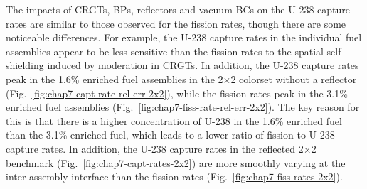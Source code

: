 
The impacts of \acp{CRGT}, \acp{BP}, reflectors and vacuum \acp{BC} on the U-238 capture rates are similar to those observed for the fission rates, though there are some noticeable differences. For example, the U-238 capture rates in the individual fuel assemblies appear to be less sensitive than the fission rates to the spatial self-shielding induced by moderation in \acp{CRGT}. In addition, the U-238 capture rates peak in the 1.6\% enriched fuel assemblies in the 2$\times$2 colorset without a reflector (Fig.~\ref{fig:chap7-capt-rate-rel-err-2x2}), while the fission rates peak in the 3.1\% enriched fuel assemblies (Fig.~\ref{fig:chap7-fiss-rate-rel-err-2x2}). The key reason for this is that there is a higher concentration of U-238 in the 1.6\% enriched fuel than the 3.1\% enriched fuel, which leads to a lower ratio of fission to U-238 capture rates. In addition, the U-238 capture rates in the reflected 2$\times$2 benchmark (Fig.~\ref{fig:chap7-capt-rates-2x2}) are more smoothly varying at the inter-assembly interface than the fission rates (Fig.~\ref{fig:chap7-fiss-rates-2x2}).

